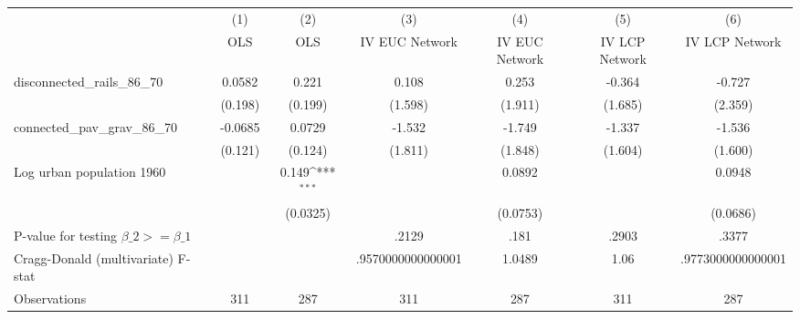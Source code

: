 {
\def\sym#1{\ifmmode^{#1}\else\(^{#1}\)\fi}
\begin{tabular}{l*{6}{c}}
\hline\hline
                &\multicolumn{1}{c}{(1)}&\multicolumn{1}{c}{(2)}&\multicolumn{1}{c}{(3)}&\multicolumn{1}{c}{(4)}&\multicolumn{1}{c}{(5)}&\multicolumn{1}{c}{(6)}\\
                &\multicolumn{1}{c}{OLS}&\multicolumn{1}{c}{OLS}&\multicolumn{1}{c}{IV EUC Network}&\multicolumn{1}{c}{IV EUC Network}&\multicolumn{1}{c}{IV LCP Network}&\multicolumn{1}{c}{IV LCP Network}\\
\hline
disconnected\_rails\_86\_70&   0.0582         &    0.221         &    0.108         &    0.253         &   -0.364         &   -0.727         \\
                &  (0.198)         &  (0.199)         &  (1.598)         &  (1.911)         &  (1.685)         &  (2.359)         \\
[1em]
connected\_pav\_grav\_86\_70&  -0.0685         &   0.0729         &   -1.532         &   -1.749         &   -1.337         &   -1.536         \\
                &  (0.121)         &  (0.124)         &  (1.811)         &  (1.848)         &  (1.604)         &  (1.600)         \\
[1em]
Log urban population 1960&                  &    0.149\sym{***}&                  &   0.0892         &                  &   0.0948         \\
                &                  & (0.0325)         &                  & (0.0753)         &                  & (0.0686)         \\
\hline
P-value for testing $\beta\_{2} >= \beta\_{1}$&                  &                  &    .2129         &     .181         &    .2903         &    .3377         \\
Cragg-Donald (multivariate) F-stat&                  &                  &.9570000000000001         &   1.0489         &     1.06         &.9773000000000001         \\
Observations    &      311         &      287         &      311         &      287         &      311         &      287         \\
\hline\hline
\end{tabular}
}
